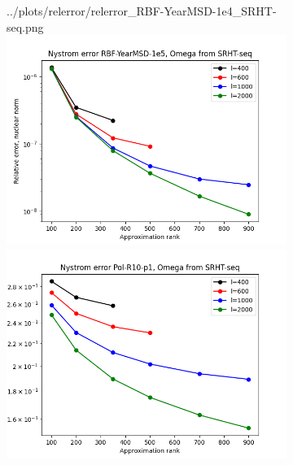 \documentclass{article}
\theoremstyle{definition}
\begin{document}
\begin{appendices}
\begin{figure}[!ht]
\begin{subfigure}[t]{\textwidth+20pt\relax}
        {../plots/relerror/relerror_RBF-YearMSD-1e4_SRHT-seq.png}
    \includegraphics[width=\dimexpr\linewidth-20pt\relax]
        {../plots/relerror/relerror_RBF-YearMSD-1e5_SRHT-seq.png}
    \includegraphics[width=\dimexpr\linewidth-20pt\relax]
        {../plots/relerror/relerror_Pol-R10-p1_SRHT-seq.png}

\end{subfigure}
\end{figure}
\end{appendices}
\end{document}
